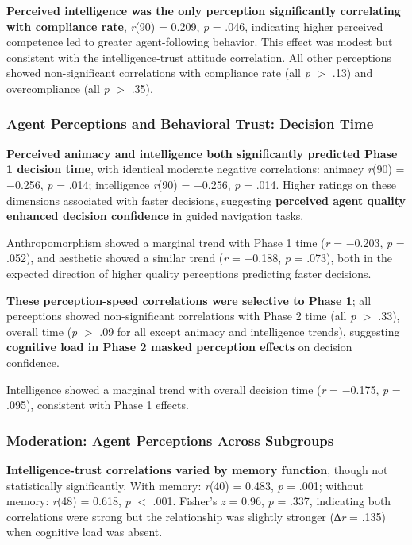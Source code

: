 \documentclass[12pt]{article}
\begin{document}
\textbf{Perceived intelligence was the only perception significantly correlating with compliance rate}, \textit{r}(90) = 0.209, \textit{p} = .046, indicating higher perceived competence led to greater agent-following behavior. This effect was modest but consistent with the intelligence-trust attitude correlation. All other perceptions showed non-significant correlations with compliance rate (all \textit{p} $>$ .13) and overcompliance (all \textit{p} $>$ .35).

\subsubsection{Agent Perceptions and Behavioral Trust: Decision Time}

\textbf{Perceived animacy and intelligence both significantly predicted Phase 1 decision time}, with identical moderate negative correlations: animacy \textit{r}(90) = $-$0.256, \textit{p} = .014; intelligence \textit{r}(90) = $-$0.256, \textit{p} = .014. Higher ratings on these dimensions associated with faster decisions, suggesting \textbf{perceived agent quality enhanced decision confidence} in guided navigation tasks.

Anthropomorphism showed a marginal trend with Phase 1 time (\textit{r} = $-$0.203, \textit{p} = .052), and aesthetic showed a similar trend (\textit{r} = $-$0.188, \textit{p} = .073), both in the expected direction of higher quality perceptions predicting faster decisions.

\textbf{These perception-speed correlations were selective to Phase 1}; all perceptions showed non-significant correlations with Phase 2 time (all \textit{p} $>$ .33), overall time (\textit{p} $>$ .09 for all except animacy and intelligence trends), suggesting \textbf{cognitive load in Phase 2 masked perception effects} on decision confidence.

Intelligence showed a marginal trend with overall decision time (\textit{r} = $-$0.175, \textit{p} = .095), consistent with Phase 1 effects.

\subsubsection{Moderation: Agent Perceptions Across Subgroups}

\textbf{Intelligence-trust correlations varied by memory function}, though not statistically significantly. With memory: \textit{r}(40) = 0.483, \textit{p} = .001; without memory: \textit{r}(48) = 0.618, \textit{p} $<$ .001. Fisher's \textit{z} = 0.96, \textit{p} = .337, indicating both correlations were strong but the relationship was slightly stronger (∆\textit{r} = .135) when cognitive load was absent.
\end{document}
